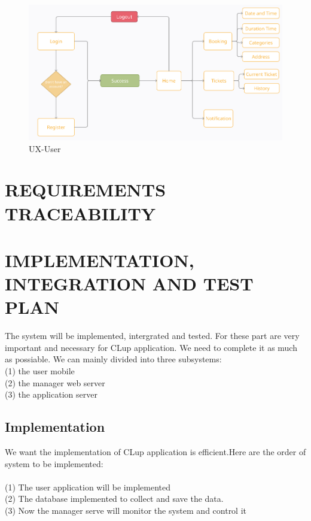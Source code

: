 \documentclass[a4paper,12pt]{report}
\begin{document}
\begin{figure}[H]
	\centering
	\includegraphics[scale=0.5]{UX-User}
	\caption{UX-User}
	\centering
	\label{fig:ux-user}
\end{figure}



\chapter{REQUIREMENTS TRACEABILITY}\label{ch:requirements-traceability}


\chapter{IMPLEMENTATION, INTEGRATION AND TEST PLAN}\label{ch:implementation-integration-and-test-plan}

The system will be implemented, intergrated and tested. For these part are very important and necessary for CLup application. We need to complete it as much as possiable. We can mainly divided into three subsystems: ~\\
(1) the user mobile~\\
(2) the manager web server ~\\
(3) the application server~\\

\section{Implementation }
We want the implementation of CLup application is efficient.Here are the order of system to be implemented:~\\
~\\
(1) The user application will be implemented ~\\
(2) The database implemented to collect and save the data.~\\
(3) Now the manager serve will monitor the system and control it~\\
\end{document}
